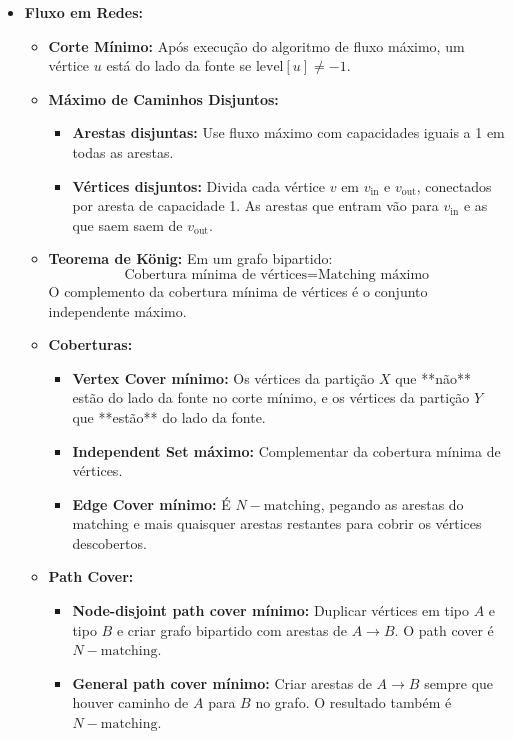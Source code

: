 \begin{small}
\begin{itemize}
    \item \textbf{Fluxo em Redes:}
    \begin{itemize}
        \item \textbf{Corte Mínimo:} Após execução do algoritmo de fluxo máximo, um vértice $u$ está do lado da fonte se $\text{level}[u] \neq -1$.
        
        \item \textbf{Máximo de Caminhos Disjuntos:}
        \begin{itemize}
            \item \textbf{Arestas disjuntas:} Use fluxo máximo com capacidades iguais a 1 em todas as arestas.
            \item \textbf{Vértices disjuntos:} Divida cada vértice $v$ em $v_{\text{in}}$ e $v_{\text{out}}$, conectados por aresta de capacidade 1. As arestas que entram vão para $v_{\text{in}}$ e as que saem saem de $v_{\text{out}}$.
        \end{itemize}

        \item \textbf{Teorema de König:} Em um grafo bipartido:
        \[
        \text{Cobertura mínima de vértices} = \text{Matching máximo}
        \]
        O complemento da cobertura mínima de vértices é o conjunto independente máximo.

        \item \textbf{Coberturas:}
        \begin{itemize}
            \item \textbf{Vertex Cover mínimo:} Os vértices da partição $X$ que **não** estão do lado da fonte no corte mínimo, e os vértices da partição $Y$ que **estão** do lado da fonte.
            \item \textbf{Independent Set máximo:} Complementar da cobertura mínima de vértices.
            \item \textbf{Edge Cover mínimo:} É $N - \text{matching}$, pegando as arestas do matching e mais quaisquer arestas restantes para cobrir os vértices descobertos.
        \end{itemize}

        \item \textbf{Path Cover:}
        \begin{itemize}
            \item \textbf{Node-disjoint path cover mínimo:} Duplicar vértices em tipo $A$ e tipo $B$ e criar grafo bipartido com arestas de $A \to B$. O path cover é $N - \text{matching}$.
            \item \textbf{General path cover mínimo:} Criar arestas de $A \to B$ sempre que houver caminho de $A$ para $B$ no grafo. O resultado também é $N - \text{matching}$.
        \end{itemize}


\end{itemize}
\end{itemize}
\end{small}
